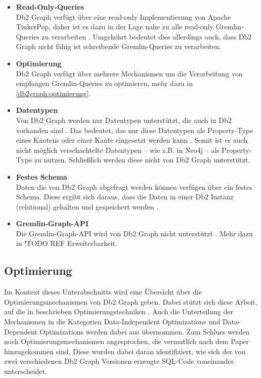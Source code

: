 \begin{itemize}
    \item \textbf{Read-Only-Queries}\\
    Db2 Graph verfügt über eine read-only Implementierung von Apache TinkerPop, daher ist es dazu in der Lage nahe zu alle read-only Gremlin-Queries zu verarbeiten \cite{ibm_docs_limitiations}. Umgekehrt bedeutet dies allerdings auch, dass Db2 Graph nicht fähig ist schreibende Gremlin-Queries zu verarbeiten.
    \item \textbf{Optimierung}\\
    Db2 Graph verfügt über mehrere Mechanismen um die Verarbeitung von empfangen Gremlin-Queries zu optimieren, mehr dazu in \autoref{db2graph:optimierung}.
    \item \textbf{Datentypen}\\
    Von Db2 Graph werden nur Datentypen unterstützt, die auch in Db2 vorhanden sind \cite{ibm_docs_limitiations}. Das bedeutet, das nur diese Datentypen als Property-Type eines Knotens oder einer Kante eingesetzt werden kann \cite{ibm_docs_limitiations}. Somit ist es auch nicht möglich verschachtelte Datentypen -- wie z.B. in Neo4j -- als Property-Type zu nutzen. Schließlich werden diese nicht von Db2 Graph unterstützt.
    \item \textbf{Festes Schema}\\
    Daten die von Db2 Graph abgefragt werden können verfügen über ein festes Schema. Diese ergibt sich daraus, dass die Daten in einer Db2 Instanz (relational) gehalten und gespeichert werden \cite{sigmod_tian,vldb_tian,yt_tian}.
    \item \textbf{Gremlin-Graph-API}\\
    Die Gremlin-Graph-API wird von Db2 Graph nicht unterstützt \cite{ibm_docs_limitiations}. Mehr dazu in !TODO REF Erweiterbarkeit.
\end{itemize}

\subsection{Optimierung}
\label{db2graph:optimierung}

Im Kontext dieses Unterabschnitts wird eine Übersicht über die Optimierungsmechanismen von Db2 Graph geben. Dabei stützt sich diese Arbeit, auf die in \cite{sigmod_tian} beschrieben Optimierungstechniken \cite{sigmod_tian}. Auch die Unterteilung der Mechanismen in die Kategorien Data-Independent Optimizations und Data-Dependent Optimizations werden dabei aus \cite{sigmod_tian} übernommen. Zum Schluss werden noch Optimierungsmechanismen angesprochen, die vermutlich nach dem Paper \cite{sigmod_tian} hinzugekommen sind. Diese wurden dabei daran identifiziert, wie sich der von zwei verschiedenen Db2 Graph Versionen erzeugte SQL-Code voneinander unterscheidet. 

